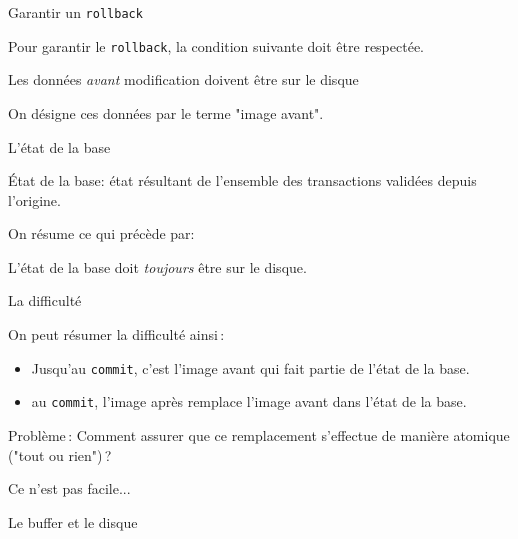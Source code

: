 \begin{frame}{Garantir un \texttt{rollback}}

Pour garantir le \texttt{rollback}, la condition suivante doit être respectée.
\vfill

\centerline{\alert{Les données \emph{avant} modification doivent
être sur le disque}}

\vfill

On désigne  ces données par le terme "image avant".

\end{frame}

\begin{frame}{L'état de la base}

\alert{\'Etat de la base}: état résultant de l'ensemble des transactions \alert{validées} 
depuis l'origine.

\bigskip

On résume ce qui précède par:

\bigskip

\centerline{\alert{L'état de la base doit \emph{toujours} être sur le disque.}}

\end{frame}


\begin{frame}{La difficulté}


On peut résumer la difficulté ainsi\,:

\vfill

\begin{itemize}
   \item Jusqu'au \texttt{commit}, c'est \alert{l'image avant} qui 
       fait partie de l'état de la base.
     \item au \texttt{commit},  \alert{l'image après} remplace  \alert{l'image avant}
     dans l'état de la base.
\end{itemize}

\vfill

\begin{block}{}
\alert{Problème}\,: Comment assurer que ce remplacement s'effectue de manière \alert{atomique} ("tout ou rien")\,?

\medskip

\vfill
\alert{Ce n'est pas facile...}

\end{block}

\end{frame}



\begin{frame}{Le buffer et le disque}


\end{frame}

